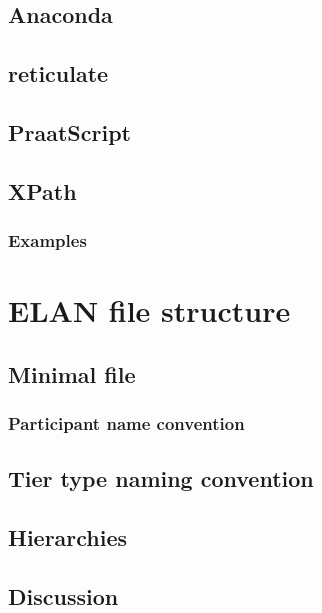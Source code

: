 \documentclass[]{book}
\theoremstyle{definition}
\theoremstyle{definition}
\theoremstyle{definition}
\theoremstyle{remark}
\begin{document}
\section{Anaconda}\label{anaconda}

\section{reticulate}\label{reticulate}

\section{PraatScript}\label{praatscript}

\section{XPath}\label{xpath}

\subsection{Examples}\label{examples}

\chapter{ELAN file structure}\label{elan-file-structure}

\section{Minimal file}\label{minimal-file}

\subsection{Participant name
convention}\label{participant-name-convention}

\section{Tier type naming convention}\label{tier-type-naming-convention}

\section{Hierarchies}\label{hierarchies}

\section{Discussion}\label{discussion}
\end{document}

